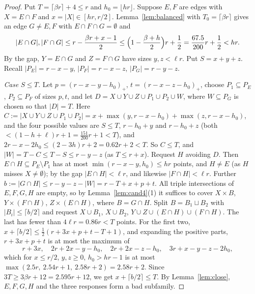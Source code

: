 \documentclass[11pt]{amsart}
\theoremstyle{definition}
\theoremstyle{remark}
\newcommand{\ceil}[1]{\lceil #1\rceil}
\newcommand{\floor}[1]{\lfloor #1\rfloor}
\begin{document}
\begin{proof}
Put $T=\ceil{\beta r}+4\le r$ and $h_0=\floor{hr}$. Suppose $E,F$ are edges with $X=E\cap F$ and $x=|X|\in[hr,r/2]$. Lemma~\ref{lem:balanced} with $T_0=\ceil{\beta r}$ gives an edge $G\ne E,F$ with $E\cap F\cap G=\emptyset$ and
\[
|E\cap G|,|F\cap G|\le r-\frac{\beta r+x-1}{2}\le\Bigl(1-\frac{\beta+h}{2}\Bigr)r+\frac12=\frac{67.5}{200}r+\frac12<hr .
\]
By the gap, $Y=E\cap G$ and $Z=F\cap G$ have sizes $y,z<\ell r$. Put $S=x+y+z$. Recall $|P_E|=r-x-y$, $|P_F|=r-x-z$, $|P_G|=r-y-z$.

\emph{Case $S\le T$.} Let $p=(r-x-y-h_0)_+$, $t=(r-x-z-h_0)_+$, choose $P_1\subseteq P_E$, $P_2\subseteq P_F$ of sizes $p,t$, and let $D=X\cup Y\cup Z\cup P_1\cup P_2\cup W$, where $W\subseteq P_G$ is chosen so that $|D|=T$. Here $C:=|X\cup Y\cup Z\cup P_1\cup P_2|=x+\max(y,r-x-h_0)+\max(z,r-x-h_0)$, and the four possible values are $S\le T$, $r-h_0+y$ and $r-h_0+z$ (both $<(1-h+\ell)r+1=\tfrac{151}{200}r+1<T$), and $2r-x-2h_0\le(2-3h)r+2=0.62r+2<T$. So $C\le T$, and $|W|=T-C\le T-S\le r-y-z$ (as $T\le r+x$). Request $H$ avoiding $D$. Then $E\cap H\subseteq P_E\setminus P_1$ has at most $\min(r-x-y,h_0)\le hr$ points, and $H\ne E$ (as $H$ misses $X\ne\emptyset$); by the gap $|E\cap H|<\ell r$, and likewise $|F\cap H|<\ell r$. Further $b:=|G\cap H|\le r-y-z-|W|=r-T+x+p+t$. All triple intersections of $E,F,G,H$ are empty, so by Lemma~\ref{lem:cand4}(1) it suffices to cover $X\times B$, $Y\times(F\cap H)$, $Z\times(E\cap H)$, where $B=G\cap H$. Split $B=B_1\sqcup B_2$ with $|B_i|\le\ceil{b/2}$ and request $X\cup B_1$, $X\cup B_2$, $Y\cup Z\cup(E\cap H)\cup(F\cap H)$. The last has fewer than $4\ell r=0.86r<T$ points. For the first two, $x+\ceil{b/2}\le\tfrac12(r+3x+p+t-T+1)$, and expanding the positive parts, $r+3x+p+t$ is at most the maximum of
\[
r+3x,\quad 2r+2x-y-h_0,\quad 2r+2x-z-h_0,\quad 3r+x-y-z-2h_0,
\]
which for $x\le r/2$, $y,z\ge0$, $h_0>hr-1$ is at most $\max(2.5r,\ 2.54r+1,\ 2.58r+2)=2.58r+2$. Since $3T\ge3\beta r+12=2.595r+12$, we get $x+\ceil{b/2}\le T$. By Lemma~\ref{lem:close}, $E,F,G,H$ and the three responses form a bad subfamily.


\end{proof}
\end{document}
